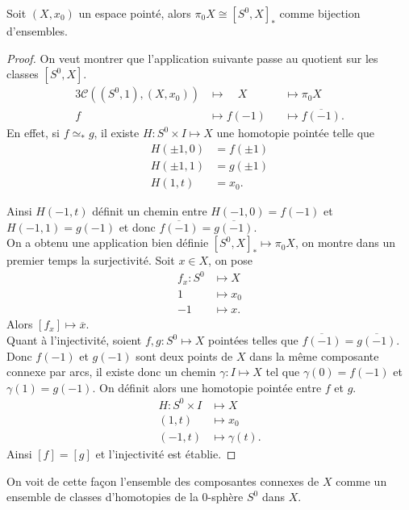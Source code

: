 \documentclass[main.tex]{subfiles}
\begin{document}
	\begin{prop}
		Soit $(X,x_{0})$ un espace pointé, alors $\pi_{0} X \cong [S^{0},X]_{*}$ comme bijection d'ensembles.
	\end{prop}
	\begin{proof}
		On veut montrer que l'application suivante passe au quotient sur les classes $[S^{0},X]$.
		\begin{alignat*}{3}
			\mathcal{C}((S^{0},1),(X, x_{0})) &\longmapsto \quad X &&\longmapsto \pi_{0} X \\
			f &\longmapsto f(-1) &&\longmapsto \overline{f(-1)}
		.\end{alignat*}
		En effet, si $f\simeq_{*} g$, il existe $H : S^{0} \times I \longmapsto X$ une homotopie pointée telle que 
			\begin{align*}
				H(\pm 1,0) &= f(\pm 1) \\
				H(\pm 1,1) &= g(\pm 1) \\
				H(1,t) &= x_{0}
			.\end{align*}
			
			Ainsi $H(-1,t)$ définit un chemin entre $H(-1,0)=f(-1)$ et $H(-1,1) = g(-1)$ et donc $\overline{f(-1)} = \overline{g(-1)}$. \\
		On a obtenu une application bien définie $[S^{0},X]_{*} \longmapsto \pi_{0}X$, on montre dans un premier temps la surjectivité. Soit $x\in X$, on pose 
		\begin{align*}
			f_{x} : S^{0} &\longmapsto X \\
			1 &\longmapsto x_{0} \\
			-1 &\longmapsto x
		.\end{align*}
		Alors $[f_{x}] \longmapsto \overline{x}$. \\
		Quant à l'injectivité, soient $f,g : S^{0} \longmapsto X$ pointées telles que $\overline{f(-1)} = \overline{g(-1)}$. Donc $f(-1)$ et $g(-1)$ sont deux points de $X$ dans la même composante connexe par arcs, il existe donc un chemin $\gamma : I \longmapsto X$ tel que $\gamma(0) = f(-1)$ et $\gamma(1) = g(-1)$. On définit alors une homotopie pointée entre $f$ et $g$.
		 \begin{align*}
			 H : S^{0} \times I &\longmapsto X \\
			 (1,t) &\longmapsto x_{0} \\
			 (-1,t) &\longmapsto \gamma(t)
		 .\end{align*}
		 Ainsi $[f] = [g]$ et l'injectivité est établie.
	\end{proof}
	\begin{remark}
		On voit de cette façon l'ensemble des composantes connexes de $X$ comme un ensemble de classes d'homotopies de la 0-sphère $S^{0}$ dans $X$.
	\end{remark}
\end{document}
